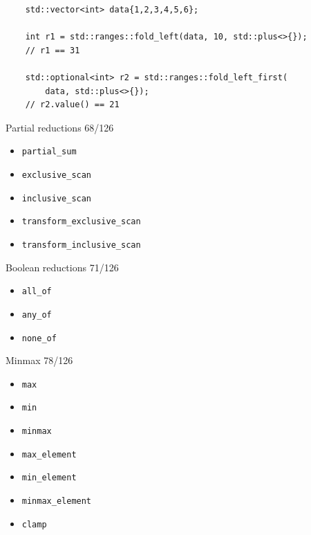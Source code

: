 \documentclass[aspectratio=169]{beamer}
\begin{document}
\begin{frame}[fragile]{}
  \begin{verbatim}
    std::vector<int> data{1,2,3,4,5,6};

    int r1 = std::ranges::fold_left(data, 10, std::plus<>{});
    // r1 == 31

    std::optional<int> r2 = std::ranges::fold_left_first(
        data, std::plus<>{});
    // r2.value() == 21
  \end{verbatim}
\end{frame}

\begin{frame}{Partial reductions 68/126}
  \begin{itemize}
    \item{\texttt{partial_sum}}
    \item{\texttt{exclusive_scan}}
    \item{\texttt{inclusive_scan}}
    \item{\texttt{transform_exclusive_scan}}
    \item{\texttt{transform_inclusive_scan}}
  \end{itemize}
\end{frame}

\begin{frame}{Boolean reductions 71/126}
  \begin{itemize}
    \item{\texttt{all_of}}
    \item{\texttt{any_of}}
    \item{\texttt{none_of}}
  \end{itemize}
\end{frame}

\begin{frame}{Minmax 78/126}
  \begin{itemize}
    \item{\texttt{max}}
    \item{\texttt{min}}
    \item{\texttt{minmax}}
    \item{\texttt{max_element}}
    \item{\texttt{min_element}}
    \item{\texttt{minmax_element}}
    \item{\texttt{clamp}}
  \end{itemize}
\end{frame}
\end{document}
